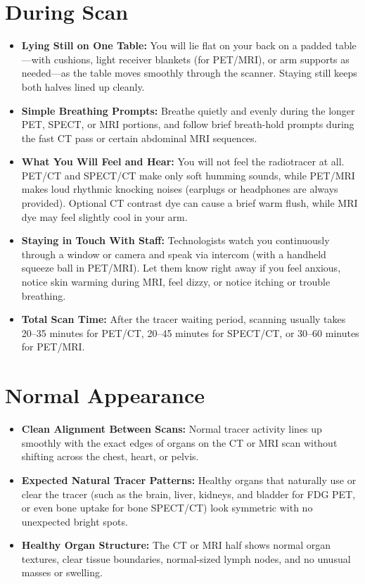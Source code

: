 \section{During Scan}
\begin{itemize}
    \item \textbf{Lying Still on One Table:} You will lie flat on your back on a padded table---with cushions, light receiver blankets (for PET/MRI), or arm supports as needed---as the table moves smoothly through the scanner. Staying still keeps both halves lined up cleanly.
    \item \textbf{Simple Breathing Prompts:} Breathe quietly and evenly during the longer PET, SPECT, or MRI portions, and follow brief breath-hold prompts during the fast CT pass or certain abdominal MRI sequences.
    \item \textbf{What You Will Feel and Hear:} You will not feel the radiotracer at all. PET/CT and SPECT/CT make only soft humming sounds, while PET/MRI makes loud rhythmic knocking noises (earplugs or headphones are always provided). Optional CT contrast dye can cause a brief warm flush, while MRI dye may feel slightly cool in your arm.
    \item \textbf{Staying in Touch With Staff:} Technologists watch you continuously through a window or camera and speak via intercom (with a handheld squeeze ball in PET/MRI). Let them know right away if you feel anxious, notice skin warming during MRI, feel dizzy, or notice itching or trouble breathing.
    \item \textbf{Total Scan Time:} After the tracer waiting period, scanning usually takes 20--35 minutes for PET/CT, 20--45 minutes for SPECT/CT, or 30--60 minutes for PET/MRI.
\end{itemize}

\section{Normal Appearance}
\begin{itemize}
    \item \textbf{Clean Alignment Between Scans:} Normal tracer activity lines up smoothly with the exact edges of organs on the CT or MRI scan without shifting across the chest, heart, or pelvis.
    \item \textbf{Expected Natural Tracer Patterns:} Healthy organs that naturally use or clear the tracer (such as the brain, liver, kidneys, and bladder for FDG PET, or even bone uptake for bone SPECT/CT) look symmetric with no unexpected bright spots.
    \item \textbf{Healthy Organ Structure:} The CT or MRI half shows normal organ textures, clear tissue boundaries, normal-sized lymph nodes, and no unusual masses or swelling.
\end{itemize}

